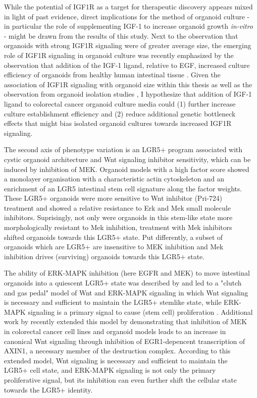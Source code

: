 \begin{flushleft}
While the potential of IGF1R as a target for therapeutic discovery appears mixed in light of past evidence, direct implications for the method of organoid culture - in particular the role of supplementing IGF-1 to increase organoid growth \textit{in-vitro} - might be drawn from the results of this study. Next to the observation that organoids with strong IGF1R signaling were of greater average size, the emerging role of IGF1R signaling in organoid culture was recently emphasized by the observation that addition of the IGF-1 ligand, relative to EGF, increased culture efficiency of organoids from healthy human intestinal tissue \citep{fujiiHumanIntestinalOrganoids2018a}. Given the association of IGF1R signaling with organoid size within this thesis as well as the observation from organoid isolation studies \citep{fujiiHumanIntestinalOrganoids2018a}, I hypothesize that addition of IGF-1 ligand to colorectal cancer organoid culture media could (1) further increase culture establishment efficiency and (2) reduce additional genetic bottleneck effects that might bias isolated organoid cultures towards increased IGF1R signaling.
\bigbreak

The second axis of phenotype variation is an LGR5+ program associated with cystic organoid architecture and Wnt signaling inhibitor sensitivity, which can be induced by inhibition of MEK. Organoid models with a high factor score showed a monolayer organisation with a characteristic actin cytoskeleton and an enrichment of an LGR5 intestinal stem cell signature along the factor weights. These LGR5+ organoids were more sensitive to Wnt inhibitor (Pri-724) treatment and showed a relative resistance to Erk and Mek small molecule inhibitors. Suprisingly, not only were organoids in this stem-like state more morphologically resistant to Mek inhibition, treatment with Mek inhibitors shifted organoids towards this LGR5+ state. Put differently, a subset of organoids which are LGR5+ are insensitive to MEK inhibition and Mek inhibition drives (surviving) organoids towards this LGR5+ state.
\smallbreak

The ability of ERK-MAPK inhibition (here EGFR and MEK) to move intestinal organoids into a quiescent LGR5+ state was described by \citep{basakInducedQuiescenceLgr52017c} and led to a "clutch and gas pedal" model of Wnt and ERK-MAPK signaling in which Wnt signaling is necessary and sufficient to maintain the LGR5+ stemlike state, while ERK-MAPK signaling is a primary signal to cause (stem cell) proliferation \citep{basakInducedQuiescenceLgr52017c}. Additional work by \citep{zhanMEKInhibitorsActivate2019a} recently extended this model by demonstrating that inhibition of MEK in colorectal cancer cell lines and organoid models leads to an increase in canonical Wnt signaling through inhibition of EGR1-depencent transcription of AXIN1, a necessary member of the destruction complex. According to this extended model, Wnt signaling is necessary and sufficient to maintain the LGR5+ cell state, and ERK-MAPK signaling is not only the primary proliferative signal, but its inhibition can even further shift the cellular state towards the LGR5+ identity. 
\smallbreak


\end{flushleft}
